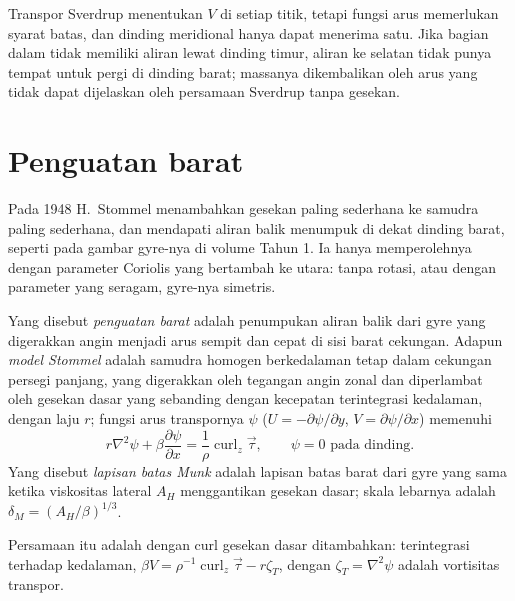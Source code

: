 Transpor Sverdrup menentukan $V$ di setiap titik, tetapi fungsi arus
memerlukan syarat batas, dan dinding meridional hanya dapat menerima satu. Jika
bagian dalam tidak memiliki aliran lewat dinding timur, aliran ke selatan
tidak punya tempat untuk pergi di dinding barat; massanya dikembalikan oleh arus
yang tidak dapat dijelaskan oleh persamaan Sverdrup tanpa gesekan.

\section{Penguatan barat}\label{sec:b3:ocean-dynamics:western}

Pada 1948 H.~Stommel menambahkan gesekan paling sederhana ke samudra paling sederhana, dan
mendapati aliran balik menumpuk di dekat dinding barat, seperti pada gambar gyre-nya di
volume Tahun 1. Ia hanya memperolehnya dengan parameter Coriolis
yang bertambah ke utara: tanpa rotasi, atau dengan parameter yang seragam,
gyre-nya simetris.

\begin{definition}\label{def:b3:ocean-dynamics:western-intensification}
Yang disebut \emph{penguatan barat} adalah
penumpukan aliran balik dari gyre yang digerakkan angin menjadi arus sempit dan cepat
di sisi barat cekungan. Adapun \emph{model
Stommel} adalah samudra homogen berkedalaman tetap dalam cekungan
persegi panjang, yang digerakkan oleh tegangan angin zonal dan diperlambat oleh gesekan dasar
yang sebanding dengan kecepatan terintegrasi kedalaman, dengan laju $r$;
fungsi arus transpornya $\psi$ ($U = -\partial\psi/\partial y$, $V =
\partial\psi/\partial x$) memenuhi
\[
r\nabla^2\psi + \beta\frac{\partial\psi}{\partial x} =
\frac{1}{\rho}\operatorname{curl}_z\vec\tau ,\qquad \psi = 0 \text{ pada dinding.}
\]
Yang disebut \emph{lapisan batas Munk} adalah lapisan batas barat dari
gyre yang sama ketika viskositas  lateral $A_H$
menggantikan gesekan dasar; skala lebarnya adalah $\delta_M =
(A_H/\beta)^{1/3}$.
\end{definition}

Persamaan itu adalah  dengan curl gesekan dasar
ditambahkan: terintegrasi terhadap kedalaman, $\beta V = \rho^{-1}\operatorname{curl}_z
\vec\tau - r\zeta_T$, dengan $\zeta_T = \nabla^2\psi$ adalah vortisitas
transpor.


